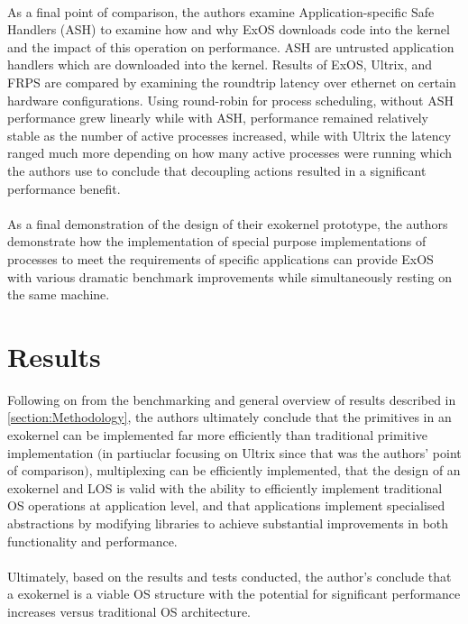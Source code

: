 \documentclass[11pt]{article}
\theoremstyle{plain}
\theoremstyle{definition}
\begin{document}
\\
As a final point of comparison, the authors examine Application-specific Safe Handlers (ASH) to examine how and why ExOS downloads code into the kernel and the impact of this operation on performance. ASH are untrusted application handlers which are downloaded into the kernel. Results of ExOS, Ultrix, and FRPS are compared by examining the roundtrip latency over ethernet on certain hardware configurations. Using round-robin for process scheduling, without ASH performance grew linearly while with ASH, performance remained relatively stable as the number of active processes increased, while with Ultrix the latency ranged much more depending on how many active processes were running which the authors use to conclude that decoupling actions resulted in a significant performance benefit.\\
\\
As a final demonstration of the design of their exokernel prototype, the authors demonstrate how the implementation of special purpose implementations of processes to meet the requirements of specific applications can provide ExOS with various dramatic benchmark improvements while simultaneously resting on the same machine.
\section{Results}\label{section:Results}
Following on from the benchmarking and general overview of results described in \ref{section:Methodology}, the authors ultimately conclude that the primitives in an exokernel can be implemented far more efficiently than traditional primitive implementation $($in partiuclar focusing on Ultrix since that was the authors' point of comparison$)$, multiplexing can be efficiently implemented, that the design of an exokernel and LOS is valid with the ability to efficiently implement traditional OS operations at application level, and that applications implement specialised abstractions by modifying libraries to achieve substantial improvements in both functionality and performance.\\
\\
Ultimately, based on the results and tests conducted, the author's conclude that a exokernel is a viable OS structure with the potential for significant performance increases versus traditional OS architecture.
\pagebreak
\end{document}
